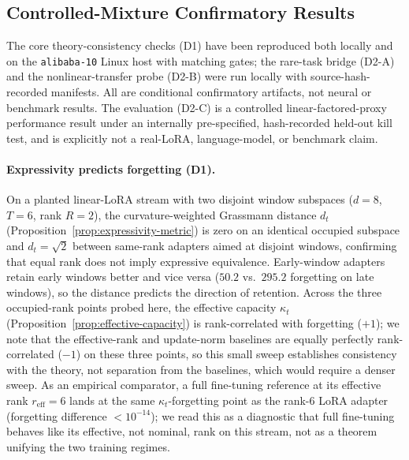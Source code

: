 \subsection{Controlled-Mixture Confirmatory Results}
\label{sec:controlled-results}

The core theory-consistency checks (D1) have been reproduced both locally and on
the \texttt{alibaba-10} Linux host with matching gates; the rare-task bridge
(D2-A) and the nonlinear-transfer probe (D2-B) were run locally with
source-hash-recorded manifests. All are conditional confirmatory artifacts, not
neural or benchmark results. The \method{} evaluation (D2-C) is a controlled
linear-factored-proxy performance result under an internally pre-specified,
hash-recorded held-out kill test, and is explicitly not a real-LoRA,
language-model, or benchmark claim.

\paragraph{Expressivity predicts forgetting (D1).}
On a planted linear-LoRA stream with two disjoint window subspaces
($d=8$, $T=6$, rank $R=2$), the curvature-weighted Grassmann distance
$d_t$ (Proposition~\ref{prop:expressivity-metric}) is zero on an identical
occupied subspace and $d_t=\sqrt{2}$ between same-rank adapters aimed at
disjoint windows, confirming that equal rank does not imply expressive
equivalence. Early-window adapters retain early windows better and vice versa
($50.2$ vs.\ $295.2$ forgetting on late windows), so the distance predicts the
direction of retention. Across the three occupied-rank points probed here, the
effective capacity $\kappa_t$ (Proposition~\ref{prop:effective-capacity}) is
rank-correlated with forgetting ($+1$); we note that the effective-rank and
update-norm baselines are equally perfectly rank-correlated ($-1$) on these
three points, so this small sweep establishes consistency with the theory, not
separation from the baselines, which would require a denser sweep. As an empirical comparator, a full fine-tuning reference at its effective rank
$r_{\mathrm{eff}}=6$ lands at the same $\kappa_t$-forgetting point as the rank-6
LoRA adapter (forgetting difference $<10^{-14}$); we read this as a diagnostic
that full fine-tuning behaves like its effective, not nominal, rank on this
stream, not as a theorem unifying the two training regimes.

